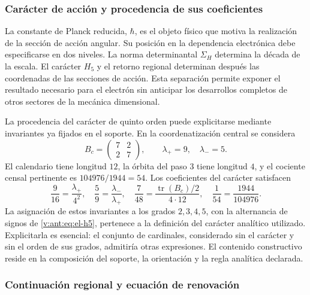 \subsubsection{Carácter de acción y procedencia de sus coeficientes}
\label{v:ant:sec:revision-planck}

La constante de Planck reducida, \(\hbar\), es el objeto físico que
motiva la realización de la sección de acción angular. Su posición en
la dependencia electrónica debe especificarse en dos niveles. La norma
determinantal \(\Sigma_H\) determina la década de la escala. El carácter
\(H_5\) y el retorno regional determinan después las coordenadas de las
secciones de acción. Esta separación permite exponer el resultado
necesario para el electrón sin anticipar los desarrollos completos de
otros sectores de la mecánica dimensional.

La procedencia del carácter de quinto orden puede explicitarse mediante
invariantes ya fijados en el soporte. En la coordenatización central se considera
\[
 B_c=\begin{pmatrix}7&2\\2&7\end{pmatrix},
 \qquad \lambda_+=9,\quad\lambda_-=5.
\]
El calendario tiene longitud \(12\), la órbita del paso \(3\) tiene
longitud \(4\), y el cociente censal pertinente es
\(104976/1944=54\). Los coeficientes del carácter satisfacen
\begin{equation}
 \frac9{16}=\frac{\lambda_+}{4^2},\quad
 \frac59=\frac{\lambda_-}{\lambda_+},\quad
 \frac7{48}=\frac{\operatorname{tr}(B_c)/2}{4\cdot12},\quad
 \frac1{54}=\frac{1944}{104976}.
 \label{v:ant:eq:revision-h5-coeficientes}
\end{equation}
La asignación de estos invariantes a los grados \(2,3,4,5\), con la
alternancia de signos de \eqref{v:ant:eq:el-h5}, pertenece a la definición del
carácter analítico utilizado. Explicitarla es esencial: el conjunto de
cardinales, considerado sin el carácter y sin el orden de sus grados,
admitiría otras expresiones. El contenido constructivo reside en la
composición del soporte, la orientación y la regla analítica declarada.

\subsubsection{Continuación regional y ecuación de renovación}

